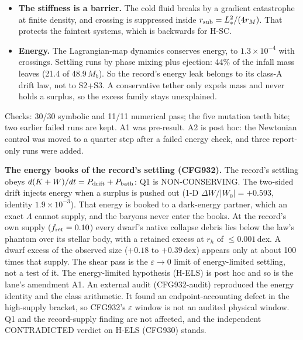 \documentclass[10pt]{article}
\begin{document}
\begin{itemize}
\item \textbf{The stiffness is a barrier.} The cold fluid breaks by a gradient catastrophe at finite density, and crossing is suppressed inside $r_{\rm sub}=L_*^2/(4r_M)$. That protects the faintest systems, which is backwards for H-SC.
\item \textbf{Energy.} The Lagrangian-map dynamics conserves energy, to $1.3\times10^{-4}$ with crossings. Settling runs by phase mixing plus ejection: 44\% of the infall mass leaves (21.4 of 48.9\,$M_b$). So the record's energy leak belongs to its class-A drift law, not to S2+S3. A conservative tether only expels mass and never holds a surplus, so the excess family stays unexplained.
\end{itemize}
Checks: 30/30 symbolic and 11/11 numerical pass; the five mutation teeth bite; two earlier failed runs are kept. A1 was pre-result. A2 is post hoc: the Newtonian control was moved to a quarter step after a failed energy check, and three report-only runs were added.

\textbf{The energy books of the record's settling (CFG932).} The record's settling obeys $d(K+W)/dt=P_{\rm drift}+P_{\rm bath}$: Q1 is NON-CONSERVING. The two-sided drift injects energy when a surplus is pushed out (1-D $\Delta W/|W_0|=+0.593$, identity $1.9\times10^{-3}$). That energy is booked to a dark-energy partner, which an exact $\Lambda$ cannot supply, and the baryons never enter the books. At the record's own supply ($f_{\rm ret}=0.10$) every dwarf's native collapse debris lies below the law's phantom over its stellar body, with a retained excess at $r_h$ of $\le0.001$\,dex. A dwarf excess of the observed size ($+0.18$ to $+0.39$\,dex) appears only at about 100 times that supply. The shear pass is the $\varepsilon\to0$ limit of energy-limited settling, not a test of it. The energy-limited hypothesis (H-ELS) is post hoc and so is the lane's amendment A1.
An external audit (CFG932-audit) reproduced the energy identity and the class arithmetic. It found an endpoint-accounting defect in the high-supply bracket, so CFG932's $\varepsilon$ window is not an audited physical window. Q1 and the record-supply finding are not affected, and the independent CONTRADICTED verdict on H-ELS (CFG930) stands.
\end{document}
